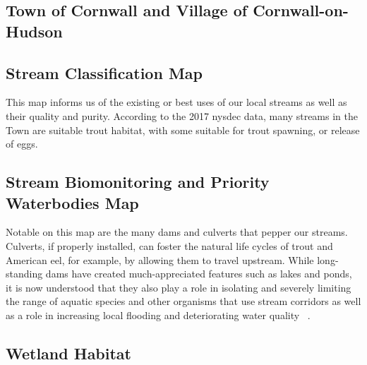 \subsection*{Town of Cornwall and Village of Cornwall-on-Hudson}
\subsection*{Stream Classification Map}
This map informs us of the existing or best uses of our local streams as well
as their quality and purity. According to the 2017 \gls{nysdec} data, many
streams in the Town are suitable trout habitat, with some suitable for trout
spawning, or release of eggs.

\subsection*{Stream Biomonitoring and Priority Waterbodies Map}
Notable on this map are the many dams and culverts that pepper our streams.
Culverts, if properly installed, can foster the natural life cycles of trout
and American eel, for example, by allowing them to travel upstream. While
long-standing dams have created much-appreciated features such as lakes and
ponds, it is now understood that they also play a role in isolating and
severely limiting the range of aquatic species and other organisms that use
stream corridors as well as a role in increasing local flooding and
deteriorating water quality ~\citep{haeckel2014}.

\subsection{Wetland Habitat}

